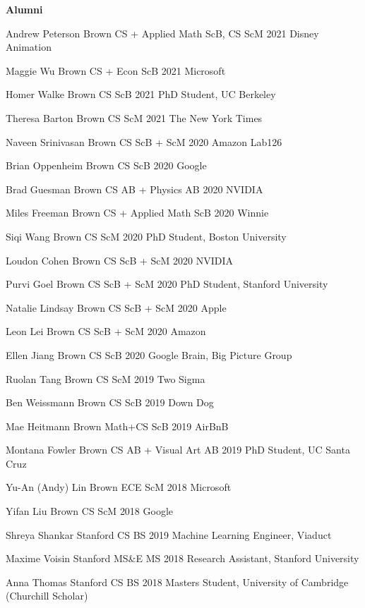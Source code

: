 \documentclass[line,margin]{res}
\begin{document}
\begin{resume}

\textbf{Alumni}

\alumni
{Andrew Peterson}
{Brown CS + Applied Math ScB, CS ScM}
{2021}
{Disney Animation}

\alumni
{Maggie Wu}
{Brown CS + Econ ScB}
{2021}
{Microsoft}

\alumni
{Homer Walke}
{Brown CS ScB}
{2021}
{PhD Student, UC Berkeley}

\alumni
{Theresa Barton}
{Brown CS ScM}
{2021}
{The New York Times}

\alumni
{Naveen Srinivasan}
{Brown CS ScB + ScM}
{2020}
{Amazon Lab126}

\alumni
{Brian Oppenheim}
{Brown CS ScB}
{2020}
{Google}

\alumni
{Brad Guesman}
{Brown CS AB + Physics AB}
{2020}
{NVIDIA}

\alumni
{Miles Freeman}
{Brown CS + Applied Math ScB}
{2020}
{Winnie}

\alumni
{Siqi Wang}
{Brown CS ScM}
{2020}
{PhD Student, Boston University}

\alumni
{Loudon Cohen}
{Brown CS ScB + ScM}
{2020}
{NVIDIA}

\alumni
{Purvi Goel}
{Brown CS ScB + ScM}
{2020}
{PhD Student, Stanford University}

\alumni
{Natalie Lindsay}
{Brown CS ScB + ScM}
{2020}
{Apple}

\alumni
{Leon Lei}
{Brown CS ScB + ScM}
{2020}
{Amazon}

\alumni
{Ellen Jiang}
{Brown CS ScB}
{2020}
{Google Brain, Big Picture Group}


\alumni
{Ruolan Tang}
{Brown CS ScM}
{2019}
{Two Sigma}

\alumni
{Ben Weissmann}
{Brown CS ScB}
{2019}
{Down Dog}

\alumni
{Mae Heitmann}
{Brown Math+CS ScB}
{2019}
{AirBnB}

\alumni
{Montana Fowler}
{Brown CS AB + Visual Art AB}
{2019}
{PhD Student, UC Santa Cruz}

\alumni
{Yu-An (Andy) Lin}
{Brown ECE ScM}
{2018}
{Microsoft}

\alumni
{Yifan Liu}
{Brown CS ScM}
{2018}
{Google}

\alumni
{Shreya Shankar}
{Stanford CS BS}
{2019}
{Machine Learning Engineer, Viaduct}

\alumni
{Maxime Voisin}
{Stanford MS\&E MS}
{2018}
{Research Assistant, Stanford University}

\alumni
{Anna Thomas}
{Stanford CS BS}
{2018}
{Masters Student, University of Cambridge (Churchill Scholar)}


\end{resume}
\end{document}
